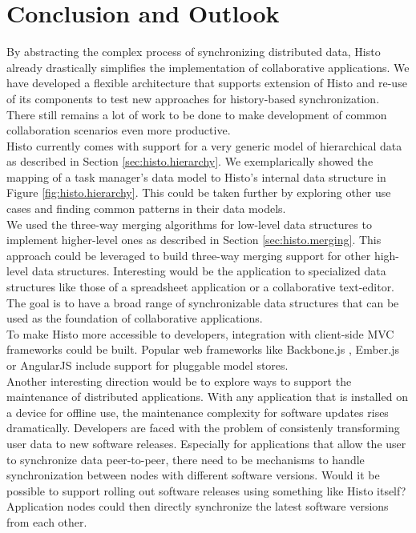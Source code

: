 \section{Conclusion and Outlook}
By abstracting the complex process of synchronizing distributed data, Histo already drastically simplifies the implementation of collaborative applications.
We have developed a flexible architecture that supports extension of Histo and re-use of its components to test new approaches for history-based synchronization.\\
There still remains a lot of work to be done to make development of common collaboration scenarios even more productive.\\
Histo currently comes with support for a very generic model of hierarchical data as described in Section \ref{sec:histo.hierarchy}.
We exemplarically showed the mapping of a task manager's data model to Histo's internal data structure in Figure \ref{fig:histo.hierarchy}.
This could be taken further by exploring other use cases and finding common patterns in their data models.\\
We used the three-way merging algorithms for low-level data structures to implement higher-level ones as described in Section \ref{sec:histo.merging}.
This approach could be leveraged to build three-way merging support for other high-level data structures.
Interesting would be the application to specialized data structures like those of a spreadsheet application or a collaborative text-editor.\\
The goal is to have a broad range of synchronizable data structures that can be used as the foundation of collaborative applications.\\

To make Histo more accessible to developers, integration with client-side MVC frameworks could be built.
Popular web frameworks like Backbone.js \cite{backbone}, Ember.js \cite{ember} or AngularJS \cite{angular} include support for pluggable model stores.\\

Another interesting direction would be to explore ways to support the maintenance of distributed applications.
With any application that is installed on a device for offline use, the maintenance complexity for software updates rises dramatically.
Developers are faced with the problem of consistenly transforming user data to new software releases.
Especially for applications that allow the user to synchronize data peer-to-peer, there need to be mechanisms to handle synchronization between nodes with different software versions.
Would it be possible to support rolling out software releases using something like Histo itself?
Application nodes could then directly synchronize the latest software versions from each other.
